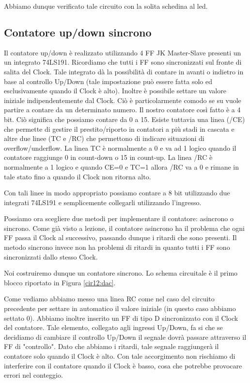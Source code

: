 Abbiamo dunque verificato tale circuito con la solita schedina al led. 

\subsection{Contatore up/down sincrono}

Il contatore up/down è realizzato utilizzando 4 FF JK Master-Slave presenti un un integrato 74LS191. Ricordiamo che tutti i FF sono sincronizzati sul fronte di salita del Clock. Tale integrato dà la possibilità di contare in avanti o indietro in base al controllo Up/Down (tale impostazione può essere fatta solo ed esclusivamente quando il Clock è alto). Inoltre è possibile settare un valore iniziale indipendentemente dal Clock. Ciò è particolarmente comodo se su vuole partire a contare da un determinato numero. Il nostro contatore così fatto è a 4 bit. Ciò significa che possiamo contare da 0 a 15. Esiste tuttavia una linea (/CE) che permette di gestire il prestito/riporto in contatori a più stadi in cascata e altre due linee (TC e /RC) che permettono di indicare situazioni di overflow/underflow. La linea TC è normalmente a 0 e va ad 1 logico quando il contatore raggiunge 0 in count-down o 15 in count-up. La linea /RC è normalmente a 1 logico e quando CE=0 e TC=1 allora /RC va a 0 e rimane in tale stato fino a quando il Clock non ritorna alto.

Con tali linee in modo appropriato possiamo contare a 8 bit utilizzando due integrati 74LS191 e semplicemente collegarli utilizzando l'ingresso.

Possiamo ora scegliere due metodi per implementare il contatore: asincrono o sincrono. Come già visto a lezione, il contatore asincrono ha il problema che ogni FF passa il Clock al successivo, passando dunque i ritardi che sono presenti. Il metodo sincrono invece non ha problemi di ritardi in quanto tutti i FF sono sincronizzati dallo stesso Clock. 

Noi costruiremo dunque un contatore sincrono. Lo schema circuitale è il primo blocco riportato in Figura \ref{cir12:dac}.

Come vediamo abbiamo messo una linea RC come nel caso del circuito precedente per settare in automatico il valore iniziale (in questo caso abbiamo settato 0). Abbiamo inoltre inserito un FF di tipo D sincronizzato con il Clock del contatore. Tale elemento,  collegato agli ingressi Up/Down, fa si che se decidiamo di cambiare il controllo Up/Down il segnale dovrà passare attraverso il FF di "controllo". Dato che abbiamo i ritardi, tale segnale raggiungerà il contatore solo  quando il Clock è alto. Con tale accorgimento non rischiamo di interferire con il contatore quando il Clock è basso, cosa che potrebbe provocare errori nel conteggio.

